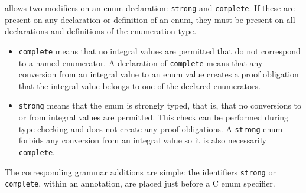 \NAME allows two modifiers on an enum declaration: \lstinline|strong| and \lstinline|complete|. If these are present on any declaration or definition of an enum, they must be present on all declarations and definitions of the enumeration type.
\begin{itemize}
	\item \lstinline|complete| means that no integral values are permitted that do not correspond to a named enumerator. A declaration of \lstinline|complete| means that any conversion from an integral value to an enum value 
	creates a proof obligation that the integral value belongs to one of the declared enumerators.
	\item \lstinline|strong| means that the enum is strongly
	typed, that is, that no conversions to or from integral
	values are permitted. This check can be performed during
	type checking and does not create any proof obligations.
	A \lstinline|strong| enum forbids any conversion from an integral value
	so it is also necessarily \lstinline|complete|.
\end{itemize}

The corresponding grammar additions are simple: the identifiers \lstinline|strong| or \lstinline|complete|, within an \NAME annotation, are placed just before a C enum specifier.

